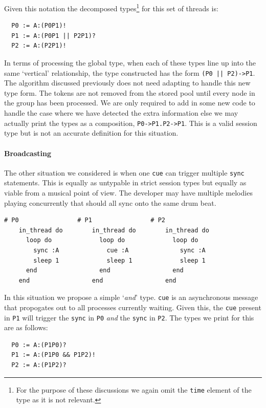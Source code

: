 \documentclass[11pt, abstracton, twoside, titlepage=true]{scrartcl}
\begin{document}
Given this notation the decomposed types\footnote{For the purpose of these discussions
we again omit the \texttt{time} element of the type as it is not relevant.} for this 
set of threads is:
\\
\begin{lstlisting}
  P0 := A:(P0P1)!
  P1 := A:(P0P1 || P2P1)?
  P2 := A:(P2P1)!
\end{lstlisting}

In terms of processing the global type, when each of these types line up
into the same `vertical' relationship, the type constructed has the form 
\texttt{(P0 || P2)->P1}. The algorithm discussed previously does not need
adapting to handle this new type form. The tokens are not removed from the
stored pool until every node in the group has been processed. We are only
required to add in some new code to handle the case where we have detected
the extra information else we may actually print the types as a composition,
\texttt{P0->P1.P2->P1}. This is a valid session type but is not an accurate
definition for this situation.

\paragraph{Broadcasting}
The other situation we considered is when one \texttt{cue} can trigger
multiple \texttt{sync} statements. This is equally as untypable in strict
session types but equally as viable from a musical point of view. The developer
may have multiple melodies playing concurrently that should all sync onto the
same drum beat.

\begin{minipage}{\textwidth}
	\begin{lstlisting}[style = sonicpi]
    # P0                # P1                # P2
    in_thread do        in_thread do        in_thread do
      loop do             loop do             loop do
        sync :A             cue :A              sync :A
        sleep 1             sleep 1             sleep 1
      end                 end                 end
    end                 end                 end
	\end{lstlisting}
\end{minipage}

In this situation we propose a simple `\emph{and}' type. \texttt{cue} is an
asynchronous message that propogates out to all processes currently waiting.
Given this, the \texttt{cue} present in \texttt{P1} will trigger the \texttt{sync}
in \texttt{P0} \emph{and} the \texttt{sync} in \texttt{P2}. The types we 
print for this are as follows:
\\
\begin{lstlisting}
  P0 := A:(P1P0)?
  P1 := A:(P1P0 && P1P2)!
  P2 := A:(P1P2)?
\end{lstlisting}
\end{document}
